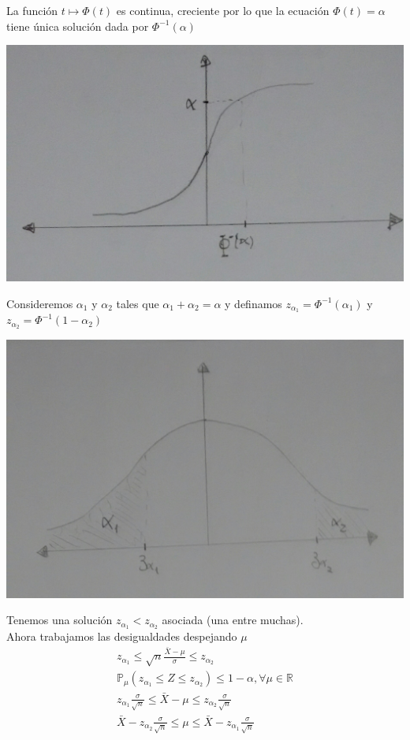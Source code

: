 \documentclass[10pt]{article}
\theoremstyle{plain}
\theoremstyle{definition}
\begin{document}
La función $t \mapsto \Phi(t)$ es continua, creciente por lo que la ecuación $\Phi(t) = \alpha$ tiene única solución dada por $\Phi^{-1}(\alpha)$
\begin{center}
\includegraphics[scale=0.2]{imagenes/normal2.jpg}
\end{center}
Consideremos $\alpha_{1}$ y $\alpha_{2}$ tales que $\alpha_{1}+\alpha_{2}=\alpha$ y definamos $z_{\alpha_{1}} = \Phi^{-1}(\alpha_{1})$ y $z_{\alpha_{2}} = \Phi^{-1}(1-\alpha_{2})$	
\begin{center}
\includegraphics[scale=0.2]{imagenes/normal3.jpg}
\end{center}
Tenemos una solución $z_{\alpha_{1}} < z_{\alpha_{2}}$ asociada (una entre muchas).\\
Ahora trabajamos las desigualdades despejando $\mu$
\begin{align*}
z_{\alpha_{1}} \le \sqrt{n} \frac{\bar{X}-\mu}{\sigma} \le z_{\alpha_{2}} \\
\mathbb{P}_{\mu}(z_{\alpha_{1}} \le Z \le z_{\alpha_{2}}) \le 1 - \alpha, \forall \mu \in \mathbb{R} \\
z_{\alpha_{1}} \frac{\sigma}{\sqrt{n}} \le \bar{X} - \mu \le z_{\alpha_{2}} \frac{\sigma}{\sqrt{n}}\\
\bar{X} - z_{\alpha_{2}} \frac{\sigma}{\sqrt{n}} \le \mu \le \bar{X} - z_{\alpha_{1}} \frac{\sigma}{\sqrt{n}}
\end{align*}
\end{document}
